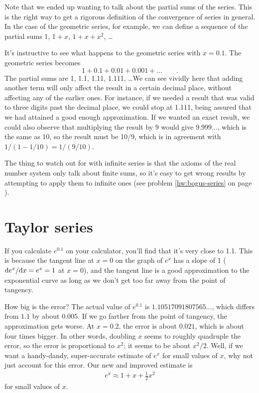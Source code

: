 Note that we ended up wanting to talk about the partial sums of the series. This is the right way to get a rigorous definition of
the convergence of series in general.
In the case of the geometric series, for example,
we can define a sequence of the
partial sums 1, $1+x$, $1+x+x^2$, \ldots 

It's instructive to see what happens to the geometric series with $x=0.1$. The geometric series becomes\label{geometric-tenths}
\begin{equation*}
  1 + 0.1 + 0.01 + 0.001 + \ldots \qquad .
\end{equation*}
The partial sums are 1, 1.1, 1.11, 1.111, \ldots We can see vividly here that adding another term will only affect
the result in a certain decimal place, without affecting any of the earlier ones. For instance, if we needed a
result that was valid to three digits past the decimal place, we could stop at 1.111, being assured that we had
attained a good enough approximation. If we wanted an exact result, we could also observe that multiplying the
result by 9 would give $9.999\ldots$, which is the same as 10, so the result must be 10/9, which is in agreement
with $1/(1-1/10)=1/(9/10)$.

The thing to watch out for with infinite series is that
the axioms of the real number system only talk about finite sums, so it's easy to get wrong results
by attempting to apply them to infinite ones (see problem
\ref{hw:bogus-series} on page \pageref{hw:bogus-series}).\label{infinite-sum-warning}

\section{Taylor series}\label{sec:taylor}

If you calculate $e^{0.1}$ on your calculator, you'll find that
it's very close to 1.1. This is because the tangent line at $x=0$
on the graph of $e^x$ has a slope of 1 ($\textup{d} e^x/\textup{d} x=e^x=1$ at $x=0$),
and the tangent line is a good approximation to the exponential curve
as long as we don't get too far away from the point of tangency.


How big is the error? The actual value of $e^{0.1}$ is $1.10517091807565\ldots$, which
differs from $1.1$ by about $0.005$. If we go farther from the point of tangency,
the approximation gets worse. At $x=0.2$, the error is about $0.021$, which is about
four times bigger. In other words, doubling $x$ seems to roughly quadruple the error,
so the error is proportional to $x^2$; it seems to be about $x^2/2$. Well, if we want a handy-dandy, super-accurate
estimate of $e^x$ for small values of $x$, why not just account for this
error. Our new and improved estimate is
\begin{align*}
  e^x \approx 1+x+\frac{1}{2}x^2
\end{align*}
for small values of $x$.

